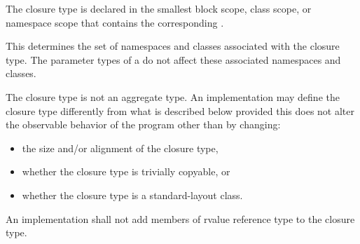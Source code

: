 \pnum
The closure type is declared in the smallest block
scope, class scope, or namespace scope that contains the corresponding
. \begin{note} This determines the set of namespaces and
classes associated with the closure type. The parameter
types of a  do not affect these associated namespaces and
classes. \end{note} The closure type is not an aggregate type.
An implementation may define the closure type differently from what
is described below provided this does not alter the observable behavior of the program
other than by changing:

\begin{itemize}
\item the size and/or alignment of the closure type,

\item whether the closure type is trivially copyable, or

\item whether the closure type is a standard-layout class.
\end{itemize}

An implementation shall not add members of rvalue reference type to the closure
type.

